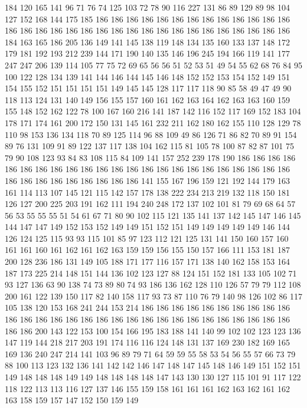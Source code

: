 184 120 165 141 96 71 76 74 125 103 72 78 90 116 227 131 86 89 129 89
98 104 127 152 168 144 175 185 186 186 186 186 186 186 186 186 186 186 186 186
186 186 186 186 186 186 186 186 186 186 186 186 186 186 186 186 186 186 186 186
184 163 165 186 205 136 149 141 145 138 119 148 134 135 160 133 137 148 172 179
181 192 193 212 239 144 171 190 140 135 146 196 245 194 166 119 141 177 247 247
206 139 114 105 77 75 72 69 65 56 56 51 52 53 51 49 54 55 62 68
76 84 95 100 122 128 134 139 141 144 146 144 145 146 148 152 152 153 154 152
149 151 154 155 152 151 151 151 151 149 145 145 128 117 117 118 90 85 58 49
47 49 90 118 113 124 131 140 149 156 155 157 160 161 162 163 164 162 163 163
160 159 155 148 152 162 122 78 100 167 160 216 141 187 142 116 152 117 169 152
183 104 178 171 174 161 200 172 150 131 145 161 232 211 162 180 162 155 110 128
129 78 110 98 153 136 134 118 70 89 125 114 96 88 109 49 86 126 71 86
82 70 89 91 154 89 76 131 109 91 89 122 137 117 138 104 162 115 81 105
78 100 87 82 87 101 75 79 90 108 123 93 84 83 108 115 84 109 141 157
252 239 178 190 186 186 186 186 186 186 186 186 186 186 186 186 186 186 186 186
186 186 186 186 186 186 186 186 186 186 186 186 186 186 186 186 141 155 167 196
159 121 192 144 179 163 161 114 113 107 145 121 115 142 157 178 138 222 234 213
219 132 118 150 181 126 127 200 225 203 191 162 111 194 240 248 172 137 102 101
81 79 69 68 64 57 56 53 55 55 55 51 54 61 67 71 80 90 102 115
121 135 141 137 142 145 147 146 145 144 147 147 149 152 153 152 149 149 151 152
151 149 149 149 149 149 146 144 126 124 125 115 93 93 115 101 85 97 123 112
121 125 131 141 150 160 157 160 161 161 160 161 162 161 162 163 159 159 156 155
150 157 166 111 153 181 187 200 128 236 186 131 149 105 188 171 177 116 157 171
138 140 162 158 153 164 187 173 225 214 148 151 144 136 102 123 127 88 124 151
152 181 133 105 102 71 93 127 136 63 90 138 74 73 89 80 74 93 186 136
162 128 110 126 57 79 79 112 108 200 161 122 139 150 117 82 140 158 117 93
73 87 110 76 79 140 98 126 102 86 117 105 138 120 153 168 241 244 153 214
186 186 186 186 186 186 186 186 186 186 186 186 186 186 186 186 186 186 186 186
186 186 186 186 186 186 186 186 186 186 186 200 143 122 153 100 154 166 195 183
188 141 140 99 102 102 123 123 136 147 119 144 218 217 203 191 174 116 116 124
148 131 137 169 230 182 169 165 169 136 240 247 214 141 103 96 89 79 71 64
59 59 55 58 53 54 56 55 57 66 73 79 88 100 113 123 132 136 141 142
142 146 147 148 147 145 148 146 149 151 152 151 149 148 148 148 149 149 148 148
148 148 147 143 130 130 127 115 101 91 117 122 118 122 113 113 116 127 137 146
155 159 158 161 161 161 162 163 162 161 162 163 158 159 157 147 152 150 159 149
